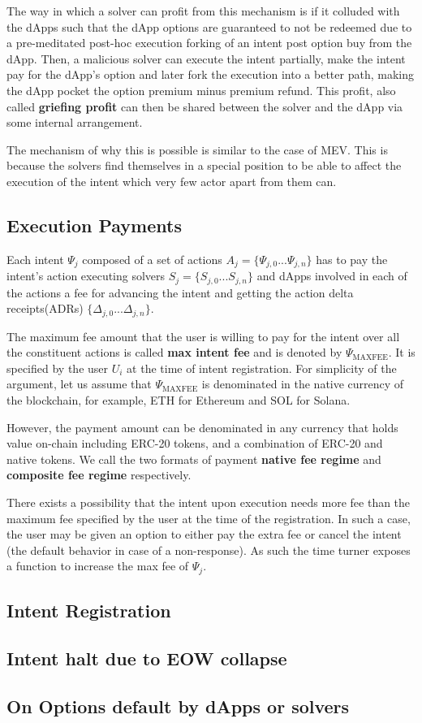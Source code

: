 The way in which a solver can profit from this mechanism is if it colluded with the dApps such that the dApp options are guaranteed to not be redeemed due to a pre-meditated post-hoc execution forking of an intent post option buy from the dApp. Then, a malicious solver can execute the intent partially, make the intent pay for the dApp's option and later fork the execution into a better path, making the dApp pocket the option premium minus premium refund. This profit, also called \textbf{griefing profit} can then be shared between the solver and the dApp via some internal arrangement.

The mechanism of why this is possible is similar to the case of MEV. This is because the solvers find themselves in a special position to be able to affect the execution of the intent which very few actor apart from them can.

\subsection{Execution Payments}
Each intent $\Psi_j$ composed of a set of actions $A_j = \{\Psi_{j, 0} ... \Psi_{j, n}\}$ has to pay the intent's action executing solvers $S_j = \{S_{j, 0} ... S_{j, n}\}$ and dApps involved in each of the actions a fee for advancing the intent and getting the action delta receipts(ADRs) $\{\Delta_{j, 0} ... \Delta_{j, n}\}$. 

The maximum fee amount that the user is willing to pay for the intent over all the constituent actions is called \textbf{max intent fee} and is denoted by $\Psi_\text{MAXFEE}$. It is specified by the user $U_i$ at the time of intent registration. For simplicity of the argument, let us assume that $\Psi_\text{MAXFEE}$ is denominated in the native currency of the blockchain, for example, ETH for Ethereum and SOL for Solana. 

However, the payment amount can be denominated in any currency that holds value on-chain including ERC-20 tokens, and a combination of ERC-20 and native tokens. We call the two formats of payment \textbf{native fee regime} and \textbf{composite fee regime} respectively.

There exists a possibility that the intent upon execution needs more fee than the maximum fee specified by the user at the time of the registration. In such a case, the user may be given an option to either pay the extra fee or cancel the intent (the default behavior in case of a non-response). As such the time turner exposes a function  to increase the max fee of $\Psi_j$.

\subsection{Intent Registration}

\subsection{Intent halt due to EOW collapse}

\subsection{On Options default by dApps or solvers}